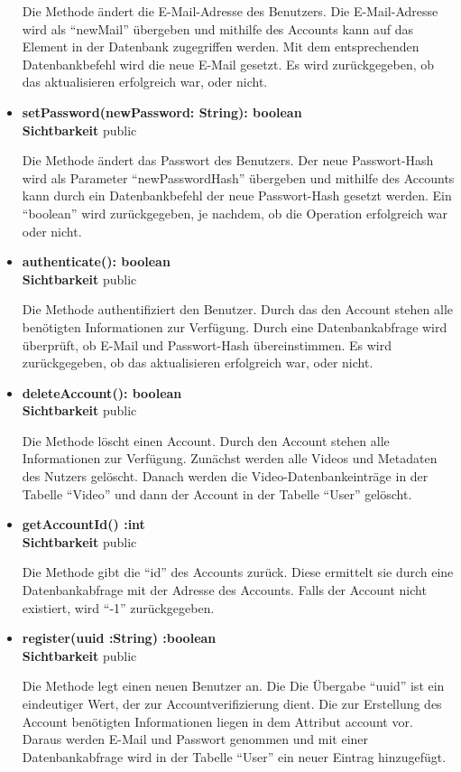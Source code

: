 \begin{itemize}
Die Methode ändert die E-Mail-Adresse des Benutzers. Die E-Mail-Adresse wird als ``newMail'' übergeben und mithilfe des Accounts kann auf das Element in der Datenbank zugegriffen werden. Mit dem entsprechenden Datenbankbefehl wird die neue E-Mail gesetzt. Es wird zurückgegeben, ob das aktualisieren erfolgreich war, oder nicht.

\item \textbf{setPassword(newPassword: String): boolean}\hfill\\
\textbf{Sichtbarkeit} public

Die Methode ändert das Passwort des Benutzers. Der neue Passwort-Hash wird als Parameter ``newPasswordHash'' übergeben und mithilfe des Accounts kann durch ein Datenbankbefehl der neue Passwort-Hash gesetzt werden. Ein ``boolean'' wird zurückgegeben, je nachdem, ob die Operation erfolgreich war oder nicht.

\item \textbf{authenticate(): boolean}\hfill\\
\textbf{Sichtbarkeit} public

Die Methode authentifiziert den Benutzer. Durch das den Account stehen alle benötigten Informationen zur Verfügung. Durch eine Datenbankabfrage wird überprüft, ob E-Mail und Passwort-Hash übereinstimmen. Es wird zurückgegeben, ob das aktualisieren erfolgreich war, oder nicht.

\item \textbf{deleteAccount(): boolean}\hfill\\
\textbf{Sichtbarkeit} public

Die Methode löscht einen Account. Durch den Account stehen alle Informationen zur Verfügung. Zunächst werden alle Videos und Metadaten des Nutzers gelöscht. Danach werden die Video-Datenbankeinträge in der Tabelle ``Video'' und dann der Account in der Tabelle ``User'' gelöscht.

\item \textbf{getAccountId() :int}\hfill\\
\textbf{Sichtbarkeit} public

Die Methode gibt die ``id'' des Accounts zurück. Diese ermittelt sie durch eine Datenbankabfrage mit der Adresse des Accounts. Falls der Account nicht existiert, wird ``-1'' zurückgegeben.

\item \textbf{register(uuid :String) :boolean}\hfill\\
\textbf{Sichtbarkeit} public

Die Methode legt einen neuen Benutzer an. Die Die Übergabe ``uuid'' ist ein eindeutiger Wert, der zur Accountverifizierung dient. Die zur Erstellung des Account benötigten Informationen liegen in dem Attribut account vor. Daraus werden E-Mail und Passwort genommen und mit einer Datenbankabfrage wird in der Tabelle ``User'' ein neuer Eintrag hinzugefügt. 


\end{itemize}

